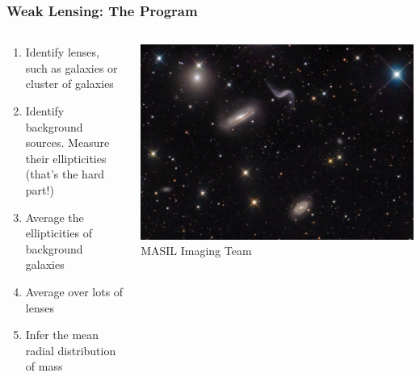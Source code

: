 \documentclass{beamer}
\begin{document}
\frame
{
    \frametitle{Weak Lensing: The Program}

    \begin{columns}
        \begin{column}{0.5\textwidth}    
            \begin{enumerate}

                \item Identify lenses, such as galaxies or cluster of galaxies

                \item Identify background sources. Measure their ellipticities
                    {\color{gold}(that's the hard part!)}


                \item Average the ellipticities of background galaxies

                \item Average over lots of lenses

                \item Infer the mean radial distribution of mass

            \end{enumerate}
        \end{column}
        \begin{column}{0.5\textwidth}
            \begin{center}
                \includegraphics[width=\textwidth]{hickson44_masil_big.jpg}
                \newline
                {\tiny MASIL Imaging Team}
            \end{center}
        \end{column}
    \end{columns}
}
\end{document}
